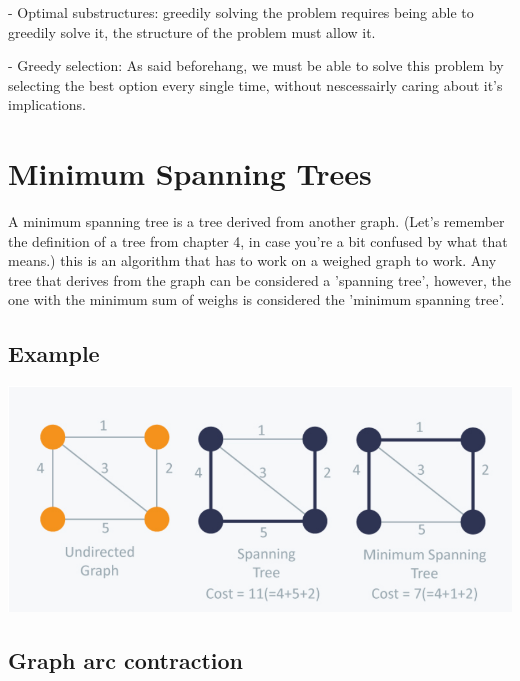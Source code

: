 \documentclass[12pt,a4paper,olive]{bbe}
\begin{document}
	- Optimal substructures: greedily solving the problem requires
	being able to greedily solve it, the structure of the problem must
	allow it.

	- Greedy selection: As said beforehang, we must be able to solve this
	problem by selecting the best option every single time, without nescessairly
	caring about it's implications.

	\section{Minimum Spanning Trees}
	A minimum spanning tree is a tree derived from another graph. (Let's remember the
	definition of a tree from chapter 4, in case you're a bit confused by what that
	means.) this is an algorithm that has to work on a weighed graph to work. Any tree that
	derives from the graph can be considered a 'spanning tree', however, the one with the
	minimum sum of weighs is considered the 'minimum spanning tree'.

	\subsection{Example}
	\includegraphics[scale=0.6]{pics/mst.png}

	\subsection{Graph arc contraction}
	
\end{document}
